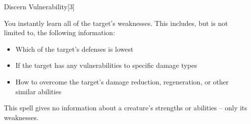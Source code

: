 \begin{spellsection}{Discern Vulnerability}[3]
    \begin{spellheader}
    \end{spellheader}
    \begin{spellcontent}
        \begin{spelltargetinginfo}
        \end{spelltargetinginfo}
        \begin{spelleffects}
            \spelleffect You instantly learn all of the target's weaknesses. This includes, but is not limited to, the following information:
            \begin{itemize}
                \item Which of the target's defenses is lowest
                \item If the target has any vulnerabilities to specific damage types
                \item How to overcome the target's damage reduction, regeneration, or other similar abilities
            \end{itemize}
        \end{spelleffects}
    \end{spellcontent}
    \begin{spellfooter}
        \spellnotes This spell gives no information about a creature's strengths or abilities -- only its weaknesses.
        \miscastrandom
    \end{spellfooter}
    \begin{spellaugments}
    \end{spellaugments}
\end{spellsection}

